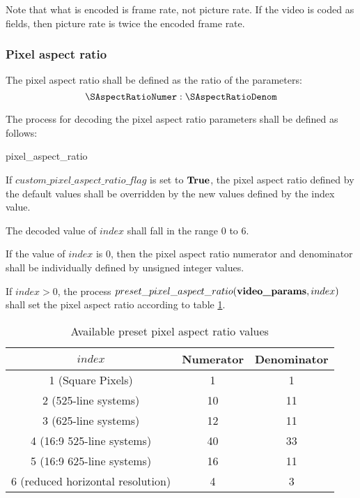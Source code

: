 \begin{informative}
Note that what is encoded is frame rate, not picture rate. If the video is coded
as fields, then picture rate is twice the encoded frame rate.
\end{informative}

\subsubsection{Pixel aspect ratio}
\label{aspectratio}

The pixel aspect ratio shall be defined as the ratio of the parameters:
		\[\SAspectRatioNumer : \SAspectRatioDenom\]

The process for decoding the pixel aspect ratio parameters shall be defined as follows:

\begin{pseudo}{pixel\_aspect\_ratio}{\VideoParams}
    \bsELSE
    \bsEND
\bsEND
\end{pseudo}

If $custom\_pixel\_aspect\_ratio\_flag$ is set to $\text{\bf{True}}$, the pixel aspect ratio 
defined by the default values shall be overridden by the new values defined by the 
index value. 

The decoded value of $index$ shall fall in the range 0 to 6.

If the value of $index$ is 0, then the pixel aspect ratio numerator and denominator 
shall be individually defined by unsigned integer values.

If $index>0$, the process $preset\_pixel\_aspect\_ratio(\textbf{video\_params}, index)$ 
shall set the pixel aspect ratio according to table \ref{table:aspectratiovalues}.

\begin{table}[!ht]
\centering
\begin{tabular}{|c|c|c|}
\hline
\rowcolor[gray]{0.75}$index$ & Numerator & Denominator \\
\hline
1 (Square Pixels) & 1 & 1 \\
\hline
2 (525-line systems) & 10 & 11 \\
\hline
3 (625-line systems) & 12 & 11 \\
\hline
4 (16:9 525-line systems) & 40 & 33 \\
\hline
5 (16:9 625-line systems) & 16 & 11 \\
\hline
6 (reduced horizontal resolution) & 4 & 3 \\
\hline
\end{tabular}
\caption{Available preset pixel aspect ratio values}\label{table:aspectratiovalues}
\end{table}

